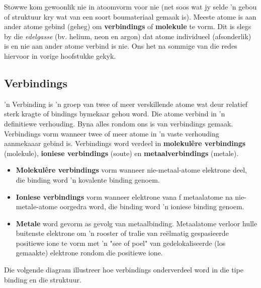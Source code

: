       \label{m38120*id307459}
Stowwe kom gewoonlik nie in atoomvorm voor nie (net soos wat jy selde 'n gebou of struktuur kry wat van een soort boumateriaal gemaak is). Meeste atome is aan ander atome  gebind (geheg) om \textbf{verbindings} of \textbf{molekule} te vorm. Dit is slegs by die \textsl{edelgasse} (bv. helium, neon en argon) dat atome individueel (afsonderlik) is en nie aan ander atome verbind is nie.  Ons het na sommige van die redes hiervoor in vorige hoofstukke gekyk.\par \pagebreak
    \subsection*{Verbindings}
            \nopagebreak

 { 'n Verbinding is 'n groep van twee of meer verskillende atome wat deur relatief sterk kragte of bindings bymekaar gehou word. Die atome verbind in  'n definitiewe verhouding.} 
Byna alles rondom ons is van verbindings gemaak. Verbindings vorm wanneer twee of meer atome in  'n vaste verhouding aanmekaaar gebind is. Verbindings word verdeel in \textbf{molekul\^{e}re verbindings} (molekule), \textbf{ioniese verbindings} (soute) en \textbf{metaalverbindings} (metale).
\begin{itemize}[noitemsep]
 \item \textbf{Molekul\^{e}re verbindings} vorm wanneer nie-metaal-atome elektrone deel, die binding word 'n kovalente binding genoem. 
\item \textbf{Ioniese verbindings} vorm wanneer elektrone vana f metaalatome na nie-metale-atome oorgedra word, die binding word  'n ioniese binding genoem. 
\item \textbf{Metale} word gevorm as gevolg van metaalbinding. Metaalatome verloor hulle buitenste elektrone om  'n rooster of tralie van reëlmatig gespasieerde positiewe ione te vorm met 'n "see of poel" van gedelokaliseerde (los gemaakte) elektrone rondom die positiewe ione. 
\end{itemize}
Die volgende diagram illustreer hoe verbindings onderverdeel word in die tipe binding en die struktuur.
